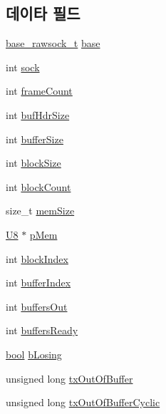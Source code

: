 \subsection*{데이타 필드}
\begin{DoxyCompactItemize}
\item 
\hyperlink{rawsock__impl_8h_ac539cdabcfe438f13001a289f222e6a2}{base\+\_\+rawsock\+\_\+t} \hyperlink{structring__rawsock__t_a1507c5af4508d59cb0a730a852763e94}{base}
\item 
int \hyperlink{structring__rawsock__t_a5903d0b282fc5eae503de618f896b5e1}{sock}
\item 
int \hyperlink{structring__rawsock__t_abaf7d77bd2fc7eb6125fa605bd645b67}{frame\+Count}
\item 
int \hyperlink{structring__rawsock__t_ac19f434244a282fa75ce90a0db4052c1}{buf\+Hdr\+Size}
\item 
int \hyperlink{structring__rawsock__t_a8556d19b129aa550f5b2819ed0320e83}{buffer\+Size}
\item 
int \hyperlink{structring__rawsock__t_a4aaa73e329d20f35039fa5cdd2e6f648}{block\+Size}
\item 
int \hyperlink{structring__rawsock__t_a8425bcfbacc94a75383be43e6114947a}{block\+Count}
\item 
size\+\_\+t \hyperlink{structring__rawsock__t_a0c5a5c70b20489656e038a0281d514c4}{mem\+Size}
\item 
\hyperlink{openavb__types__base__pub_8h_aa63ef7b996d5487ce35a5a66601f3e73}{U8} $\ast$ \hyperlink{structring__rawsock__t_ac6fe146258c3cdfbead7faecd622c7fb}{p\+Mem}
\item 
int \hyperlink{structring__rawsock__t_a2a1e28d33a60201939f6745a3b410b57}{block\+Index}
\item 
int \hyperlink{structring__rawsock__t_a73b963945a418c57630c1b66ce2aa74f}{buffer\+Index}
\item 
int \hyperlink{structring__rawsock__t_aeda5b51f8dc77d9f2012426b2e4d87aa}{buffers\+Out}
\item 
int \hyperlink{structring__rawsock__t_a06dd59c797f7aa0ca9f888304888f2a0}{buffers\+Ready}
\item 
\hyperlink{avb__gptp_8h_af6a258d8f3ee5206d682d799316314b1}{bool} \hyperlink{structring__rawsock__t_a1b1908d367566395a95aac1d61367585}{b\+Losing}
\item 
unsigned long \hyperlink{structring__rawsock__t_a93b332533b50c7524d3eb7fc03a8df7a}{tx\+Out\+Of\+Buffer}
\item 
unsigned long \hyperlink{structring__rawsock__t_ab72f6e390a1b3447a247f4c70c6ff8d0}{tx\+Out\+Of\+Buffer\+Cyclic}
\end{DoxyCompactItemize}



